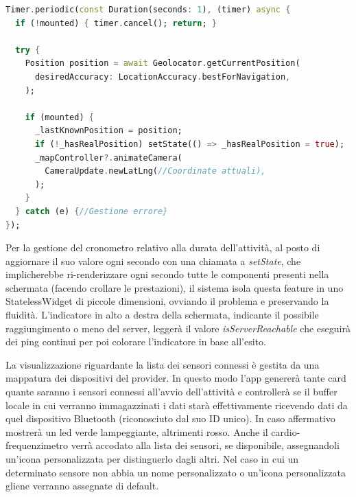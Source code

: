 \documentclass[target=bach,aauheader=,style=]{thud}
\begin{document}
\begin{lstlisting}[language=dart, caption={Richiesta ciclica della posizione GPS ad alta precisione.}, label={tracking_gps_polling}]
Timer.periodic(const Duration(seconds: 1), (timer) async {
  if (!mounted) { timer.cancel(); return; }

  try {
    Position position = await Geolocator.getCurrentPosition(
      desiredAccuracy: LocationAccuracy.bestForNavigation,
    );
    
    if (mounted) {
      _lastKnownPosition = position;
      if (!_hasRealPosition) setState(() => _hasRealPosition = true);
      _mapController?.animateCamera(
        CameraUpdate.newLatLng(//Coordinate attuali),
      );
    }
  } catch (e) {//Gestione errore}
});
\end{lstlisting}
Per la gestione del cronometro relativo alla durata dell'attività, al posto di aggiornare il suo valore ogni secondo con una chiamata a \textit{setState}, che implicherebbe ri-renderizzare ogni secondo tutte le componenti presenti nella schermata (facendo crollare le prestazioni), il sistema isola questa feature in uno StatelessWidget di piccole dimensioni, ovviando il problema e preservando la fluidità. L'indicatore in alto a destra della schermata, indicante il possibile raggiungimento o meno del server, leggerà il valore \textit{isServerReachable} che eseguirà dei ping continui per poi colorare l'indicatore in base all'esito.

La visualizzazione riguardante la lista dei sensori connessi è gestita da una mappatura dei dispositivi del provider. In questo modo l'app genererà tante card quante saranno i sensori connessi all'avvio dell'attività e controllerà se il buffer locale in cui verranno immagazzinati i dati starà effettivamente ricevendo dati da quel dispositivo Bluetooth (riconosciuto dal suo ID unico). In caso affermativo mostrerà un led verde lampeggiante, altrimenti rosso. Anche il cardio-frequenzimetro verrà accodato alla lista dei sensori, se disponibile, assegnandoli un'icona personalizzata per distinguerlo dagli altri. Nel caso in cui un determinato sensore non abbia un nome personalizzato o un'icona personalizzata gliene verranno assegnate di default. 
\end{document}

